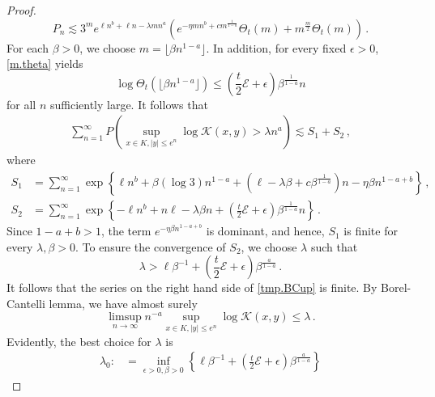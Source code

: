 \documentclass[12pt,reqno]{amsart}
\theoremstyle{remark}
\newcommand{\1}{\mathbf{1}}
\def\K{\mathcal{K}}
\def\cee{{\mathcal E}}
\def\lt{\left}
\def\rt{\right}
\begin{document}
\begin{proof}
\begin{equation*}
P_n \lesssim 3^me^{\ell n^b+\ell n-\lambda m n^a}  \left(e^{-\eta m n^b+c m ^{\frac1{1-a} }} \Theta_t(m)+ m^{\frac m2} \Theta_t(m) \right)\,.
\end{equation*}
	For each $\beta>0$, we choose $m= \lfloor\beta n^{1-a} \rfloor$. In addition, for every fixed $\epsilon>0$,  \eqref{m.theta} yields
	\begin{equation*}
		\log\Theta_t(\lfloor\beta n^{1-a}\rfloor)\le \lt(\frac t2\cee+\epsilon\rt) \beta^{\frac{1}{1-a}}n
	\end{equation*}
	for all $n$ sufficiently large. It follows that
	\begin{align}\label{tmp.BCup}
		\sum_{n=1}^\infty P\left(\sup_{x\in K,|y|\le e^n}\log\K(x,y)> \lambda n^{a}\right) \lesssim S_1+S_2\,,
	\end{align} 
	where
	\begin{align*}
		S_1&=\sum_{n=1}^\infty\exp \left\{ \ell n^b+\beta(\log 3) n^{1-a} + (\ell- \lambda \beta+c \beta^{\frac1{1-a}})n   - \eta \beta n^{1-a+b}\right\}\,,
		\\S_2&=\sum_{n=1}^\infty\exp \left\{ -\ell n^b + n \ell - \lambda \beta n + \lt(\frac t2\cee+\epsilon\rt) \beta^{\frac1{1-a}}n \right\}\,.
	\end{align*}
	Since $1-a+b>1$, the term $e^{-\eta\beta n^{1-a+b}}$ is dominant, and hence,  $S_1$ is finite for every $\lambda,\beta>0$. To ensure the convergence of $S_2$, we choose $\lambda$ such that
	\begin{equation}\label{eqn:lambda}
		\lambda> \ell \beta^{-1}+(\frac t2\cee+\epsilon) \beta^{\frac a{1-a}}\,.
	\end{equation}
	It follows that the series on the right hand side of \eqref{tmp.BCup} is finite. By Borel-Cantelli lemma, we have almost surely
	\begin{equation*}
		\limsup_{n\to\infty} n^{-a}\sup_{x\in K,|y|\le e^n}\log\K(x,y)\le \lambda\,.
	\end{equation*}
	Evidently, the best choice for $\lambda$ is 
	\begin{align}
		\lambda_0:&=\inf_{\epsilon>0,\beta>0}\lt\{\ell \beta^{-1}+(\frac t2\cee+\epsilon) \beta^{\frac a{1-a}}\rt\}

\end{align}
\end{proof}
\end{document}

